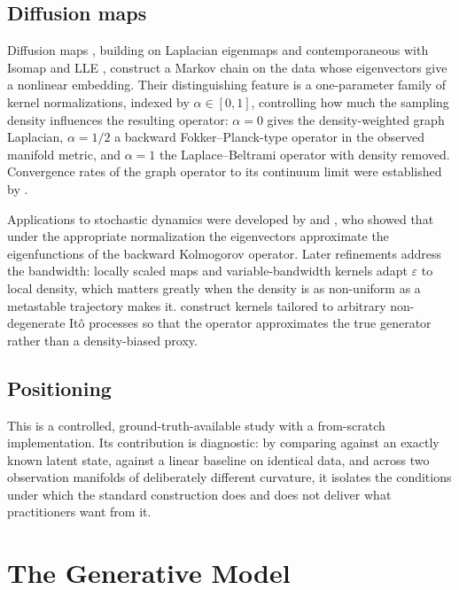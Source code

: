 \documentclass[11pt]{article}
\newcommand{\eps}{\varepsilon}
\begin{document}
\subsection{Diffusion maps}

Diffusion maps \citep{coifman2006diffusion}, building on Laplacian eigenmaps
\citep{belkin2003laplacian} and contemporaneous with Isomap
\citep{tenenbaum2000global} and LLE \citep{roweis2000nonlinear}, construct a
Markov chain on the data whose eigenvectors give a nonlinear embedding. Their
distinguishing feature is a one-parameter family of kernel normalizations,
indexed by $\alpha \in [0,1]$, controlling how much the sampling density
influences the resulting operator: $\alpha = 0$ gives the density-weighted graph
Laplacian, $\alpha = 1/2$ a backward Fokker--Planck-type operator in the observed
manifold metric, and $\alpha = 1$ the Laplace--Beltrami operator with density
removed. Convergence rates of the
graph operator to its continuum limit were established by
\citet{singer2006graph}.

Applications to stochastic dynamics were developed by \citet{nadler2006diffusion}
and \citet{coifman2008diffusion}, who showed that under the appropriate
normalization the eigenvectors approximate the eigenfunctions of the backward
Kolmogorov operator. Later refinements address the bandwidth: locally scaled maps
\citep{rohrdanz2011determination} and variable-bandwidth kernels
\citep{berry2016variable} adapt $\eps$ to local density, which matters greatly
when the density is as non-uniform as a metastable trajectory makes it.
\citet{banisch2017diffusion} construct kernels tailored to arbitrary
non-degenerate It\^o processes so that the operator approximates the true
generator rather than a density-biased proxy.

\subsection{Positioning}

This is a controlled, ground-truth-available study with a from-scratch
implementation. Its contribution is diagnostic: by comparing against an exactly
known latent state, against a linear baseline on identical data, and across two
observation manifolds of deliberately different curvature, it isolates the
conditions under which the standard construction does and does not deliver what
practitioners want from it.

\section{The Generative Model}
\label{sec:model}
\end{document}
